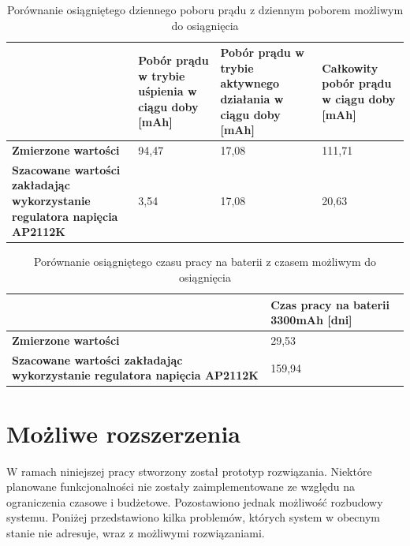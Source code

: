         \begin{table}[]
            \centering
            \caption{Porównanie osiągniętego dziennego poboru prądu z dziennym poborem możliwym do osiągnięcia}
            \begin{tabular}{p{4cm}|p{3cm}|p{3cm}|p{3cm} }
                    & \textbf{Pobór prądu w trybie uśpienia w ciągu doby [mAh]} & \textbf{Pobór prądu w trybie aktywnego działania w ciągu doby [mAh]} & \textbf{Całkowity pobór prądu w ciągu doby [mAh]} \\ \hline
             \textbf{Zmierzone wartości}
                      & 94,47 & 17,08 & 111,71 \\
            \hline
            \textbf{Szacowane wartości zakładając wykorzystanie regulatora napięcia AP2112K} &  3,54 & 17,08 & 20,63 \\
            \end{tabular}
            \label{tbl:tab2}
            \vspace{10mm}
        \end{table}

        \begin{table}[]
            \caption{Porównanie osiągniętego czasu pracy na baterii z czasem możliwym do osiągnięcia}
            \centering
            \begin{tabular}{p{}|p{}}
                    & \textbf{Czas pracy na baterii 3300mAh [dni]} \\ \hline
             \textbf{Zmierzone wartości}
                      & 29,53 \\
            \hline
            \textbf{Szacowane wartości zakładając wykorzystanie regulatora napięcia AP2112K} &  159,94  \\
            \end{tabular}
            \label{tbl:tab3}
            \vspace{10mm}
        \end{table}

	\section{Możliwe rozszerzenia}

        W ramach niniejszej pracy stworzony został prototyp rozwiązania. Niektóre planowane funkcjonalności nie zostały zaimplementowane ze względu na ograniczenia czasowe i budżetowe. Pozostawiono jednak możliwość rozbudowy systemu. Poniżej przedstawiono kilka problemów, których system w obecnym stanie nie adresuje, wraz z możliwymi rozwiązaniami.

